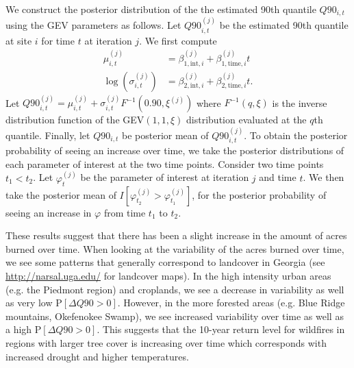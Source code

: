 \documentclass[11pt]{article}
\begin{document}
We construct the posterior distribution of the the estimated 90th quantile $Q90_{i, t}$ using the GEV parameters as follows.
Let $Q90_{i, t}^{(j)}$ be the estimated 90th quantile at site $i$ for time $t$ at iteration $j$.
We first compute
\begin{align}
  \mu_{i, t}^{(j)} &= \beta_{1, \text{int}, i}^{(j)} + \beta_{1, \text{time}, i}^{(j)} t \\
  \log\left(\sigma_{i, t}^{(j)}\right) &= \beta_{2, \text{int}, i}^{(j)} + \beta_{2, \text{time}, i}^{(j)} t. \nonumber
\end{align}
Let $Q90_{i, t}^{(j)} = \mu_{i, t}^{(j)} + \sigma_{i, t}^{(j)} F^{-1}\left(0.90, \xi^{(j)}\right)$ where $F^{-1}(q, \xi)$ is the inverse distribution function of the GEV$(1, 1, \xi)$ distribution evaluated at the $q$th quantile.
Finally, let $Q90_{i, t}$ be posterior mean of $Q90_{i, t}^{(j)}$.
To obtain the posterior probability of seeing an increase over time, we take the posterior distributions of each parameter of interest at the two time points.
Consider two time points $t_1 < t_2$.
Let $\varphi_t^{(j)}$ be the parameter of interest at iteration $j$ and time $t$.
We then take the posterior mean of $I\left[\varphi_{t_2}^{(j)} > \varphi_{t_1}^{(j)}\right]$, for the posterior probability of seeing an increase in $\varphi$ from time $t_1$ to $t_2$.

These results suggest that there has been a slight increase in the amount of acres burned over time.
When looking at the variability of the acres burned over time, we see some patterns that generally correspond to landcover in Georgia (see \url{http://narsal.uga.edu/} for landcover maps).
In the high intensity urban areas (e.g. the Piedmont region) and croplands, we see a decrease in variability as well as very low P$[\Delta Q90 > 0]$.
However, in the more forested areas (e.g. Blue Ridge mountains, Okefenokee Swamp), we see increased variability over time as well as a high P$[\Delta Q90 > 0]$.
This suggests that the 10-year return level for wildfires in regions with larger tree cover is increasing over time which corresponds with increased drought and higher temperatures.
\end{document}
